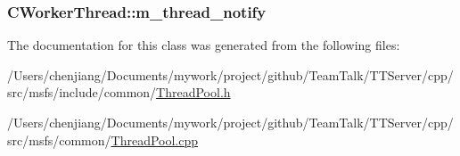 \subsubsection[{m\+\_\+thread\+\_\+notify}]{ C\+Worker\+Thread\+::m\+\_\+thread\+\_\+notify\hspace{0.3cm}{\ttfamily [private]}}\label{class_c_worker_thread_a9e4adec9400983d9264d157577bffd1c}


The documentation for this class was generated from the following files\+:\begin{DoxyCompactItemize}
\item 
/\+Users/chenjiang/\+Documents/mywork/project/github/\+Team\+Talk/\+T\+T\+Server/cpp/src/msfs/include/common/\hyperlink{_thread_pool_8h}{Thread\+Pool.\+h}\item 
/\+Users/chenjiang/\+Documents/mywork/project/github/\+Team\+Talk/\+T\+T\+Server/cpp/src/msfs/common/\hyperlink{_thread_pool_8cpp}{Thread\+Pool.\+cpp}\end{DoxyCompactItemize}
